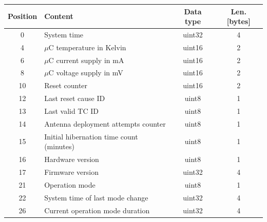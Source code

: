\begin{table}[!ht]
	\centering
	\begin{tabular}{clcc}
		\toprule[1.5pt]
		\textbf{Position}   & \textbf{Content}                         & \textbf{Data type} & \textbf{Len. [bytes]} \\
		\midrule                                                                                                          
		0                   & System time                                   & uint32             & 4                     \\
		4                   & $\mu$C temperature in Kelvin                  & uint16             & 2                     \\
		6                   & $\mu$C current supply in mA                   & uint16             & 2                     \\
		8                   & $\mu$C voltage supply in mV                   & uint16             & 2                     \\
		10                  & Reset counter                                 & uint16             & 2                     \\
		12                  & Last reset cause ID                           & uint8              & 1                     \\
		13                  & Last valid TC ID                              & uint8              & 1                     \\
		14                  & Antenna deployment attempts counter           & uint8              & 1                     \\
		15                  & Initial hibernation time count (minutes)      & uint8              & 1                     \\
        16                  & Hardware version                              & uint8              & 1                     \\
        17                  & Firmware version                              & uint32             & 4                     \\
		21                  & Operation mode                                & uint8              & 1                     \\
		22                  & System time of last mode change               & uint32             & 4                     \\
		26                  & Current operation mode duration               & uint32             & 4                     \\

\end{tabular}
\end{table}
